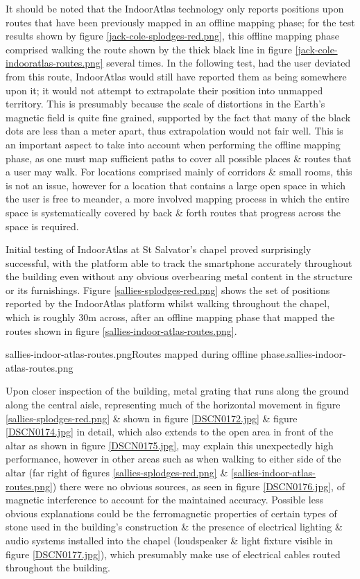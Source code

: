 It should be noted that the IndoorAtlas technology only reports positions upon routes that have been previously mapped in an offline mapping phase; for the test results shown by figure \ref{jack-cole-splodges-red.png}, this offline mapping phase comprised walking the route shown by the thick black line in figure \ref{jack-cole-indooratlas-routes.png} several times. In the following test, had the user deviated from this route, IndoorAtlas would still have reported them as being somewhere upon it; it would not attempt to extrapolate their position into unmapped territory. This is presumably because the scale of distortions in the Earth's magnetic field is quite fine grained, supported by the fact that many of the black dots are less than a meter apart, thus extrapolation would not fair well. This is an important aspect to take into account when performing the offline mapping phase, as one must map sufficient paths to cover all possible places \& routes that a user may walk. For locations comprised mainly of corridors \& small rooms, this is not an issue, however for a location that contains a large open space in which the user is free to meander, a more involved mapping process in which the entire space is systematically covered by back \& forth routes that progress across the space is required.

Initial testing of IndoorAtlas at St Salvator's chapel proved surprisingly successful, with the platform able to track the smartphone accurately throughout the building even without any obvious overbearing metal content in the structure or its furnishings. Figure \ref{sallies-splodges-red.png} shows the set of positions reported by the IndoorAtlas platform whilst walking throughout the chapel, which is roughly 30m across, after an offline mapping phase that mapped the routes shown in figure \ref{sallies-indoor-atlas-routes.png}.

       {sallies-indoor-atlas-routes.png}{Routes mapped during offline phase.}{sallies-indoor-atlas-routes.png}

Upon closer inspection of the building, metal grating that runs along the ground along the central aisle, representing much of the horizontal movement in figure \ref{sallies-splodges-red.png} \& shown in figure \ref{DSCN0172.jpg} \& figure \ref{DSCN0174.jpg} in detail, which also extends to the open area in front of the altar as shown in figure \ref{DSCN0175.jpg}, may explain this unexpectedly high performance, however in other areas such as when walking to either side of the altar (far right of figures \ref{sallies-splodges-red.png} \& \ref{sallies-indoor-atlas-routes.png}) there were no obvious sources, as seen in figure \ref{DSCN0176.jpg}, of magnetic interference to account for the maintained accuracy. Possible less obvious explanations could be the ferromagnetic properties of certain types of stone used in the building's construction \& the presence of electrical lighting \& audio systems installed into the chapel (loudspeaker \& light fixture visible in figure \ref{DSCN0177.jpg}), which presumably make use of electrical cables routed throughout the building.

